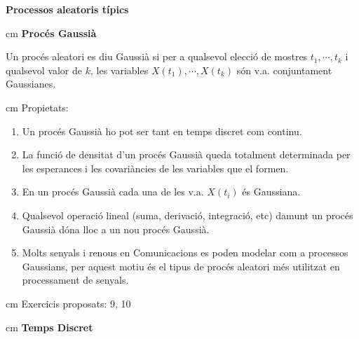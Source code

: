 \documentclass{article}
\begin{document}
\textbf{\Large Processos aleatoris t\'ipics}

 cm
\textbf{Proc\'es Gaussi\`a}

Un proc\'es aleatori es diu Gaussi\`a si per 
a qualsevol elecci\'o de mostres $t_1, \cdots, t_k$ i qualsevol valor de $k$,
les variables $X(t_1), \cdots, X(t_k)$ s\'on v.a. conjuntament Gaussianes.

 cm
Propietats:
\begin{enumerate}
\item Un proc\'es Gaussi\`a ho pot ser tant en temps discret com continu.
\item La funci\'o de densitat d'un proc\'es Gaussi\`a queda totalment 
determinada per les esperances i les covari\`ancies de les variables que el formen.
\item En un proc\'es Gaussi\`a cada una de les v.a. $X(t_i)$ \'es Gaussiana.
\item Qualsevol operaci\'o lineal (suma, derivaci\'o, integraci\'o, etc) damunt
un proc\'es Gaussi\`a d\'ona lloc a un nou proc\'es Gaussi\`a.
\item Molts senyals i renous en Comunicacions es poden modelar com a processos Gaussians,
per aquest motiu \'es el tipus de proc\'es aleatori m\'es utilitzat en processament
de senyals. 
\end{enumerate}

 cm
Exercicis proposats: 9, 10


 cm
\textbf{\large Temps Discret}
\end{document}
